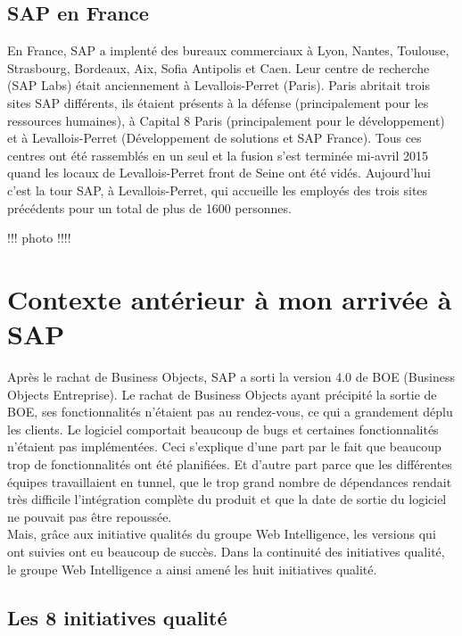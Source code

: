 \subsection{SAP en France}
En France, SAP a implenté des bureaux commerciaux à Lyon, Nantes, Toulouse, Strasbourg, Bordeaux, Aix, Sofia Antipolis et Caen. Leur centre de recherche (SAP Labs) était anciennement à Levallois-Perret (Paris). Paris abritait trois sites SAP différents, ils étaient présents à la défense (principalement pour les ressources humaines), à Capital 8 Paris (principalement pour le développement) et à Levallois-Perret (Développement de solutions et SAP France). Tous ces centres ont été rassemblés en un seul et la fusion s'est terminée mi-avril 2015 quand les locaux de Levallois-Perret front de Seine ont été vidés. Aujourd'hui c'est la tour SAP, à Levallois-Perret, qui accueille les employés des trois sites précédents pour un total de plus de 1600 personnes.

!!! photo !!!!

\section{Contexte antérieur à mon arrivée à SAP}

Après le rachat de Business Objects, SAP a sorti la version 4.0 de BOE (Business Objects Entreprise). Le rachat de Business Objects ayant précipité la sortie de BOE, ses fonctionnalités n'étaient pas au rendez-vous, ce qui a grandement déplu les clients. Le logiciel comportait beaucoup de bugs et certaines fonctionnalités n'étaient pas implémentées. 
Ceci s'explique d'une part par le fait que beaucoup trop de fonctionnalités ont été planifiées. Et d'autre part parce que les différentes équipes travaillaient en tunnel, que le trop grand nombre de dépendances rendait très difficile l'intégration complète du produit et que la date de sortie du logiciel ne pouvait pas être repoussée.\\
Mais, gr\^{a}ce aux initiative qualités du groupe Web Intelligence, les versions qui ont suivies ont eu beaucoup de succès. Dans la continuité des initiatives qualité, le groupe Web Intelligence a ainsi amené les huit initiatives qualité.

\subsection{Les 8 initiatives qualité}
